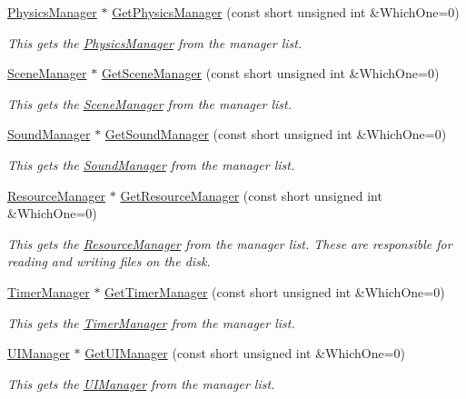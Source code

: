 \begin{DoxyCompactItemize}
\hyperlink{classphys_1_1PhysicsManager}{PhysicsManager} $\ast$ \hyperlink{classphys_1_1World_a1b9eb6206ee15c2ef49665a07de3d83c}{GetPhysicsManager} (const short unsigned int \&WhichOne=0)
\begin{DoxyCompactList}\small\item\em This gets the \hyperlink{classphys_1_1PhysicsManager}{PhysicsManager} from the manager list. \item\end{DoxyCompactList}\item 
\hyperlink{classphys_1_1SceneManager}{SceneManager} $\ast$ \hyperlink{classphys_1_1World_a86a86a78851845837ccc43da8b3a3019}{GetSceneManager} (const short unsigned int \&WhichOne=0)
\begin{DoxyCompactList}\small\item\em This gets the \hyperlink{classphys_1_1SceneManager}{SceneManager} from the manager list. \item\end{DoxyCompactList}\item 
\hyperlink{classphys_1_1SoundManager}{SoundManager} $\ast$ \hyperlink{classphys_1_1World_ac662bf5d5737a99cd3bc3ff45e7d79b8}{GetSoundManager} (const short unsigned int \&WhichOne=0)
\begin{DoxyCompactList}\small\item\em This gets the \hyperlink{classphys_1_1SoundManager}{SoundManager} from the manager list. \item\end{DoxyCompactList}\item 
\hyperlink{classphys_1_1ResourceManager}{ResourceManager} $\ast$ \hyperlink{classphys_1_1World_a8a5381637922598411a4369be6904228}{GetResourceManager} (const short unsigned int \&WhichOne=0)
\begin{DoxyCompactList}\small\item\em This gets the \hyperlink{classphys_1_1ResourceManager}{ResourceManager} from the manager list. These are responsible for reading and writing files on the disk. \item\end{DoxyCompactList}\item 
\hyperlink{classphys_1_1TimerManager}{TimerManager} $\ast$ \hyperlink{classphys_1_1World_a8e25bc6da5864d303b246224901af852}{GetTimerManager} (const short unsigned int \&WhichOne=0)
\begin{DoxyCompactList}\small\item\em This gets the \hyperlink{classphys_1_1TimerManager}{TimerManager} from the manager list. \item\end{DoxyCompactList}\item 
\hyperlink{classphys_1_1UIManager}{UIManager} $\ast$ \hyperlink{classphys_1_1World_ab7888bf9286df602490c30df6382fde9}{GetUIManager} (const short unsigned int \&WhichOne=0)
\begin{DoxyCompactList}\small\item\em This gets the \hyperlink{classphys_1_1UIManager}{UIManager} from the manager list. \item\end{DoxyCompactList}\end{DoxyCompactItemize}
